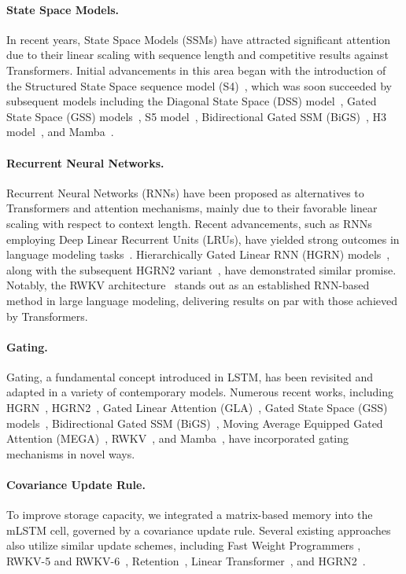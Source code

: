 \paragraph{State Space Models.} In recent years, State Space Models (SSMs) have attracted significant attention due to their linear scaling with sequence length and competitive results against Transformers. Initial advancements in this area began with the introduction of the Structured State Space sequence model (S4)~\citep{Gu:21}, which was soon succeeded by subsequent models including the Diagonal State Space (DSS) model~\citep{Gupta:22}, Gated State Space (GSS) models~\citep{Mehta:22}, S5 model~\citep{Smith:22}, Bidirectional Gated SSM (BiGS)~\citep{Wang:22}, H3 model~\citep{Fu:23}, and Mamba~\citep{Gu:24arxiv}.

\paragraph{Recurrent Neural Networks.} Recurrent Neural Networks (RNNs) have been proposed as alternatives to Transformers and attention mechanisms, mainly due to their favorable linear scaling with respect to context length. Recent advancements, such as RNNs employing Deep Linear Recurrent Units (LRUs), have yielded strong outcomes in language modeling tasks~\citep{Orvieto:23, De:24arxiv}. Hierarchically Gated Linear RNN (HGRN) models~\citep{Qin:23}, along with the subsequent HGRN2 variant~\citep{Qin:24arxiv}, have demonstrated similar promise. Notably, the RWKV architecture~\citep{Peng:23arxivshort,Peng:24arxivshort} stands out as an established RNN-based method in large language modeling, delivering results on par with those achieved by Transformers.

\paragraph{Gating.}
Gating, a fundamental concept introduced in LSTM, has been revisited and adapted in a variety of contemporary models. Numerous recent works, including HGRN~\citep{Qin:23}, HGRN2~\citep{Qin:24arxiv}, Gated Linear Attention (GLA)~\citep{Yang:23arxiv}, Gated State Space (GSS) models~\citep{Mehta:22}, Bidirectional Gated SSM (BiGS)~\citep{Wang:22}, Moving Average Equipped Gated Attention (MEGA)~\citep{Ma:22}, RWKV~\citep{Peng:23arxivshort}, and Mamba~\citep{Gu:24arxiv}, have incorporated gating mechanisms in novel ways.

\paragraph{Covariance Update Rule.} To improve storage capacity, we integrated a matrix-based memory into the mLSTM cell, governed by a covariance update rule. Several existing approaches also utilize similar update schemes, including Fast Weight Programmers \citep{Schmidhuber:92ncfastweights,Schlag:21}, RWKV-5 and RWKV-6~\citep{Peng:24arxivshort}, Retention~\citep{Sun:23arxiv}, Linear Transformer~\citep{Katharopoulos:20}, and HGRN2~\citep{Qin:24arxiv}.

